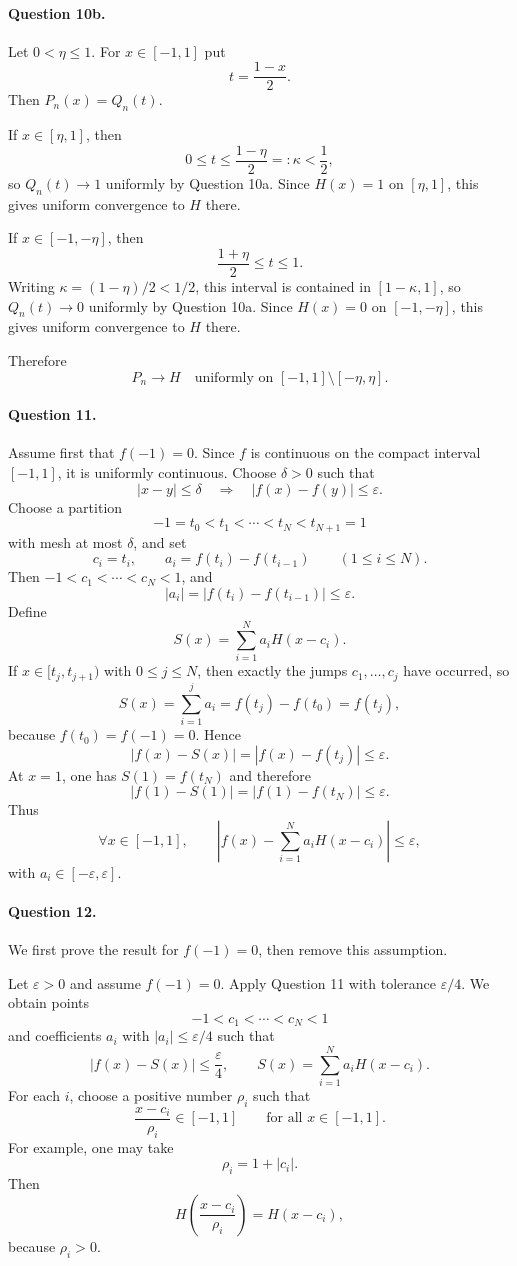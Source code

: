 \documentclass[11pt,a4paper]{article}
\begin{document}
\paragraph{Question 10b.}
Let $0<\eta\le1$.  For $x\in[-1,1]$ put
\[
  t=\frac{1-x}{2}.
\]
Then $P_n(x)=Q_n(t)$.

If $x\in[\eta,1]$, then
\[
  0\le t\le\frac{1-\eta}{2}=:\kappa<\frac12,
\]
so $Q_n(t)\to1$ uniformly by Question 10a.  Since $H(x)=1$ on $[\eta,1]$, this gives uniform convergence to $H$ there.

If $x\in[-1,-\eta]$, then
\[
  \frac{1+\eta}{2}\le t\le1.
\]
Writing $\kappa=(1-\eta)/2<1/2$, this interval is contained in $[1-\kappa,1]$, so $Q_n(t)\to0$ uniformly by Question 10a.  Since $H(x)=0$ on $[-1,-\eta]$, this gives uniform convergence to $H$ there.

Therefore
\[
  \boxed{P_n\longrightarrow H
  \quad\text{uniformly on }[-1,1]\setminus[-\eta,\eta].}
\]

\paragraph{Question 11.}
Assume first that $f(-1)=0$.  Since $f$ is continuous on the compact interval $[-1,1]$, it is uniformly continuous.  Choose $\delta>0$ such that
\[
  |x-y|\le\delta\quad\Longrightarrow\quad |f(x)-f(y)|\le\varepsilon.
\]
Choose a partition
\[
  -1=t_0<t_1<\cdots<t_N<t_{N+1}=1
\]
with mesh at most $\delta$, and set
\[
  c_i=t_i,
  \qquad
  a_i=f(t_i)-f(t_{i-1})
  \qquad(1\le i\le N).
\]
Then $-1<c_1<\cdots<c_N<1$, and
\[
  |a_i|=|f(t_i)-f(t_{i-1})|\le\varepsilon.
\]
Define
\[
  S(x)=\sum_{i=1}^N a_iH(x-c_i).
\]
If $x\in[t_j,t_{j+1})$ with $0\le j\le N$, then exactly the jumps $c_1,
\dots,c_j$ have occurred, so
\[
  S(x)=\sum_{i=1}^j a_i=f(t_j)-f(t_0)=f(t_j),
\]
because $f(t_0)=f(-1)=0$.  Hence
\[
  |f(x)-S(x)|=|f(x)-f(t_j)|\le\varepsilon.
\]
At $x=1$, one has $S(1)=f(t_N)$ and therefore
\[
  |f(1)-S(1)|=|f(1)-f(t_N)|\le\varepsilon.
\]
Thus
\[
  \boxed{\forall x\in[-1,1],\qquad
  \left|f(x)-\sum_{i=1}^N a_iH(x-c_i)\right|\le\varepsilon,}
\]
with $a_i\in[-\varepsilon,\varepsilon]$.

\paragraph{Question 12.}
We first prove the result for $f(-1)=0$, then remove this assumption.

Let $\varepsilon>0$ and assume $f(-1)=0$.  Apply Question 11 with tolerance $\varepsilon/4$.  We obtain points
\[
  -1<c_1<\cdots<c_N<1
\]
and coefficients $a_i$ with $|a_i|\le\varepsilon/4$ such that
\[
  \left|f(x)-S(x)\right|\le\frac\varepsilon4,
  \qquad
  S(x)=\sum_{i=1}^N a_iH(x-c_i).
\]
For each $i$, choose a positive number $\rho_i$ such that
\[
  \frac{x-c_i}{\rho_i}\in[-1,1]
  \qquad\text{for all }x\in[-1,1].
\]
For example, one may take
\[
  \rho_i=1+|c_i|.
\]
Then
\[
  H\left(\frac{x-c_i}{\rho_i}\right)=H(x-c_i),
\]
because $\rho_i>0$.
\end{document}
